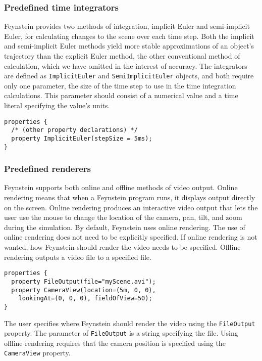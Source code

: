 \documentclass[letterpaper]{article}
\begin{document}
\subsubsection{Predefined time integrators}

Feynstein provides two methods of integration, implicit Euler and
semi-implicit Euler, for calculating changes to the scene over each
time step. Both the implicit and semi-implicit Euler methods yield
more stable approximations of an object's trajectory than the explicit
Euler method, the other conventional method of calculation, which we
have omitted in the interest of accuracy. The integrators are defined
as \texttt{ImplicitEuler} and \texttt{SemiImplicitEuler} objects, and both require
only one parameter, the size of the time step to use in the time
integration calculations. This parameter should consist of a numerical
value and a time literal specifying the value's units.

\begin{verbatim}
properties {
  /* (other property declarations) */
  property ImplicitEuler(stepSize = 5ms);
}
\end{verbatim}

\subsubsection{Predefined renderers}

Feynstein supports both online and offline methods of video output.
Online rendering means that when a Feynstein program runs, it displays
output directly on the screen. Online rendering produces an
interactive video output that lets the user use the mouse to change
the location of the camera, pan, tilt, and zoom during the
simulation. By default, Feynstein uses online rendering.  The use of
online rendering does not need to be explicitly specified.  If online
rendering is not wanted, how Feynstein should render the video needs
to be specified.  Offline rendering outputs a video file to a
specified file.

\begin{verbatim}
properties {
  property FileOutput(file="myScene.avi");
  property CameraView(location=(5m, 0, 0), 
    lookingAt=(0, 0, 0), fieldOfView=50);
}
\end{verbatim}

The user specifies where Feynstein should render the video using
the \texttt{FileOutput} property. The parameter of \texttt{File\-Output} is a
string specifying the file. Using offline rendering requires that the
camera position is specified using the \texttt{CameraView} property.
\end{document}
